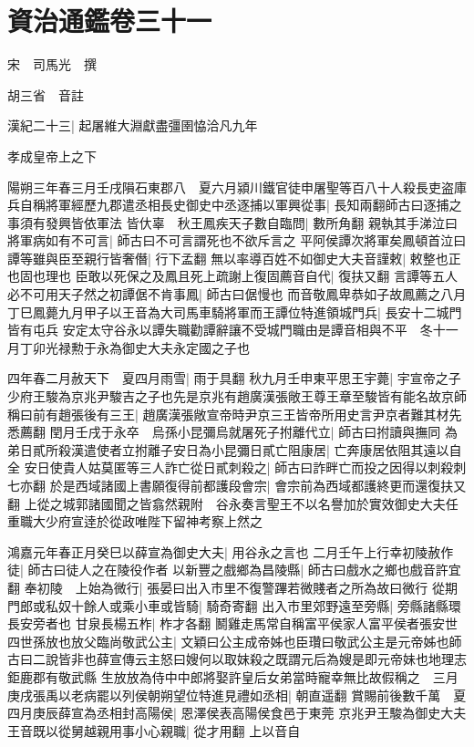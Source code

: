 \section{資治通鑑卷三十一}
宋　司馬光　撰

胡三省　音註

漢紀二十三|{
	起屠維大淵獻盡彊圉恊洽凡九年}


孝成皇帝上之下

陽朔三年春三月壬戌隕石東郡八　夏六月潁川鐵官徒申屠聖等百八十人殺長吏盗庫兵自稱將軍經歷九郡遣丞相長史御史中丞逐捕以軍興從事|{
	長知兩翻師古曰逐捕之事須有發興皆依軍法}
皆㐲辜　秋王鳳疾天子數自臨問|{
	數所角翻}
親執其手涕泣曰將軍病如有不可言|{
	師古曰不可言謂死也不欲斥言之}
平阿侯譚次將軍矣鳳頓首泣曰譚等雖與臣至親行皆奢僭|{
	行下孟翻}
無以率導百姓不如御史大夫音謹敕|{
	敕整也正也固也理也}
臣敢以死保之及鳳且死上疏謝上復固薦音自代|{
	復扶又翻}
言譚等五人必不可用天子然之初譚倨不肯事鳳|{
	師古曰倨慢也}
而音敬鳳卑恭如子故鳳薦之八月丁巳鳳薨九月甲子以王音為大司馬車騎將軍而王譚位特進領城門兵|{
	長安十二城門皆有屯兵}
安定太守谷永以譚失職勸譚辭讓不受城門職由是譚音相與不平　冬十一月丁卯光禄勲于永為御史大夫永定國之子也

四年春二月赦天下　夏四月雨雪|{
	雨于具翻}
秋九月壬申東平思王宇薨|{
	宇宣帝之子}
少府王駿為京兆尹駿吉之子也先是京兆有趙廣漢張敞王尊王章至駿皆有能名故京師稱曰前有趙張後有三王|{
	趙廣漢張敞宣帝時尹京三王皆帝所用史言尹京者難其材先悉薦翻}
閏月壬戌于永卒　烏孫小昆彌烏就屠死子拊離代立|{
	師古曰拊讀與撫同}
為弟日貳所殺漢遣使者立拊離子安日為小昆彌日貳亡阻康居|{
	亡奔康居依阻其遠以自全}
安日使貴人姑莫匿等三人詐亡從日貳刺殺之|{
	師古曰詐畔亡而投之因得以刺殺刺七亦翻}
於是西域諸國上書願復得前都護段會宗|{
	會宗前為西域都護終更而還復扶又翻}
上從之城郭諸國聞之皆翕然親附　谷永奏言聖王不以名譽加於實效御史大夫任重職大少府宣逹於從政唯陛下留神考察上然之

鴻嘉元年春正月癸巳以薛宣為御史大夫|{
	用谷永之言也}
二月壬午上行幸初陵赦作徒|{
	師古曰徒人之在陵役作者}
以新豐之戲鄉為昌陵縣|{
	師古曰戲水之鄉也戲音許宜翻}
奉初陵　上始為微行|{
	張晏曰出入市里不復警蹕若微賤者之所為故曰微行}
從期門郎或私奴十餘人或乘小車或皆騎|{
	騎奇寄翻}
出入市里郊野遠至旁縣|{
	旁縣諸縣環長安旁者也}
甘泉長楊五柞|{
	柞才各翻}
鬭雞走馬常自稱富平侯家人富平侯者張安世四世孫放也放父臨尚敬武公主|{
	文穎曰公主成帝姊也臣瓚曰敬武公主是元帝姊也師古曰二說皆非也薛宣傳云主怒曰嫂何以取妺殺之既謂元后為嫂是即元帝妹也地理志鉅鹿郡有敬武縣}
生放放為侍中中郎將娶許皇后女弟當時寵幸無比故假稱之　三月庚戌張禹以老病罷以列侯朝朔望位特進見禮如丞相|{
	朝直遥翻}
賞賜前後數千萬　夏四月庚辰薛宣為丞相封高陽侯|{
	恩澤侯表高陽侯食邑于東莞}
京兆尹王駿為御史大夫王音既以從舅越親用事小心親職|{
	從才用翻}
上以音自

